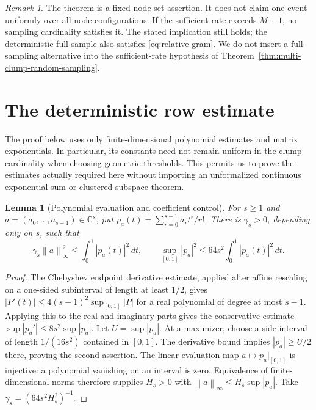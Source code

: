 \documentclass[11pt]{article}
\newtheorem{lemma}[theorem]{Lemma}
\theoremstyle{remark}\newtheorem{remark}[theorem]{Remark}
\newcommand{\C}{\mathbb C}
\newcommand{\norm}[1]{\left\lVert#1\right\rVert}
\newcommand{\abs}[1]{\left|#1\right|}
\begin{document}
\begin{remark}\label{rem:scope}
The theorem is a fixed-node-set assertion. It does not claim one event
uniformly over all node configurations. If the sufficient rate exceeds
$M+1$, no sampling cardinality satisfies it. The stated implication still
holds; the deterministic full sample also satisfies \eqref{eq:relative-gram}.
We do not insert a full-sampling alternative into the sufficient-rate
hypothesis of Theorem~\ref{thm:multi-clump-random-sampling}.
\end{remark}

\section{The deterministic row estimate}
The proof below uses only finite-dimensional polynomial estimates and
matrix exponentials. In particular, its constants need not remain uniform
in the clump cardinality when choosing geometric thresholds. This permits
us to prove the estimates actually required here without importing an
unformalized continuous exponential-sum or clustered-subspace theorem.

\begin{lemma}[Polynomial evaluation and coefficient control]
\label{lem:polynomial-evaluation}
For $s\ge1$ and $a=(a_0,\ldots,a_{s-1})\in\C^s$, put
$p_a(t)=\sum_{r=0}^{s-1}a_rt^r/r!$. There is $\gamma_s>0$, depending only
on $s$, such that
\[
 \gamma_s\norm a_\infty^2\le\int_0^1\abs{p_a(t)}^2\,dt,
 \qquad
 \sup_{[0,1]}\abs{p_a}^2\le64s^2\int_0^1\abs{p_a(t)}^2\,dt.
\]
\end{lemma}
\begin{proof}
The Chebyshev endpoint derivative estimate, applied after affine rescaling
on a one-sided subinterval of length at least $1/2$, gives
$\abs{P'(t)}\le4(s-1)^2\sup_{[0,1]}\abs P$ for a real polynomial of degree
at most $s-1$. Applying this to the real and imaginary parts gives the
conservative estimate $\sup\abs{p_a'}\le8s^2\sup\abs{p_a}$.
Let $U=\sup\abs{p_a}$. At a maximizer, choose a side interval of length
$1/(16s^2)$ contained in $[0,1]$. The derivative bound implies
$\abs{p_a}\ge U/2$ there, proving the second assertion.
The linear evaluation map $a\mapsto p_a|_{[0,1]}$ is injective: a polynomial
vanishing on an interval is zero. Equivalence of finite-dimensional norms
therefore supplies $H_s>0$ with $\norm a_\infty\le H_s\sup\abs{p_a}$.
Take $\gamma_s=(64s^2H_s^2)^{-1}$.
\end{proof}
\end{document}
